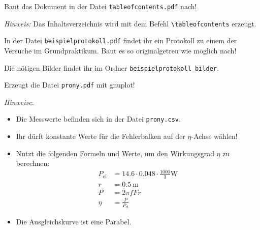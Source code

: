 \documentclass[a4paper, 12pt, headsepline, pagesize, parskip=half-, headlines=3.1]{scrartcl}
\newcounter{aufgabe}
\newenvironment{aufgabe*}[1][]{\stepcounter{aufgabe}
\noindent\textbf{Aufgabe \arabic{aufgabe}.} #1}{\bigskip}
\begin{document}
\begin{aufgabe*}
Baut das Dokument in der Datei \texttt{tableofcontents.pdf} nach!

\emph{Hinweis:} Das Inhaltsverzeichnis wird mit dem Befehl \lstinline!\tableofcontents! erzeugt.
\end{aufgabe*}

\begin{aufgabe*}
In der Datei \texttt{beispielprotokoll.pdf} findet ihr ein Protokoll zu einem der Versuche im Grundpraktikum. Baut es so originalgetreu wie möglich nach!

Die nötigen Bilder findet ihr im Ordner \texttt{beispielprotokoll\_bilder}.
\end{aufgabe*}

\begin{aufgabe*}
	Erzeugt die Datei \texttt{prony.pdf} mit gnuplot!
	
	\enlargethispage{\baselineskip}
	\emph{Hinweise}:
	\begin{itemize}
		\item Die Messwerte befinden sich in der Datei \texttt{prony.csv}.
		\item Ihr dürft konstante Werte für die Fehlerbalken auf der $η$-Achse wählen!
		\item Nutzt die folgenden Formeln und Werte, um den Wirkungsgrad $η$ zu berechnen:
		\begin{align*}
			P_\text{el} &= \num{14,6} ⋅ \num{0,048} ⋅ \frac{1000}{3} \si{\W} \\
			r &= \SI{0,5}{\m} \\
			P &= 2πfFr \\
			η &= \frac{P}{P_\text{el}}
		\end{align*}
		\item Die Ausgleichskurve ist eine Parabel.
	\end{itemize}
\end{aufgabe*}
\end{document}
